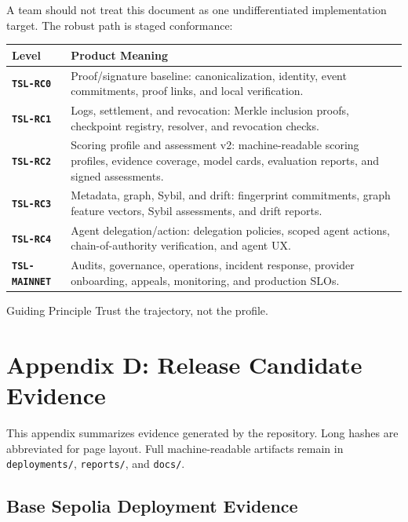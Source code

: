 \documentclass[11pt]{article}
\begin{document}
A team should not treat this document as one undifferentiated implementation target. The robust path is staged conformance:

\begin{center}
\begin{tabularx}{\textwidth}{>{\bfseries}p{} X}
\toprule
Level & Product Meaning \\
\midrule
\texttt{TSL-RC0} & Proof/signature baseline: canonicalization, identity, event commitments, proof links, and local verification. \\
\texttt{TSL-RC1} & Logs, settlement, and revocation: Merkle inclusion proofs, checkpoint registry, resolver, and revocation checks. \\
\texttt{TSL-RC2} & Scoring profile and assessment v2: machine-readable scoring profiles, evidence coverage, model cards, evaluation reports, and signed assessments. \\
\texttt{TSL-RC3} & Metadata, graph, Sybil, and drift: fingerprint commitments, graph feature vectors, Sybil assessments, and drift reports. \\
\texttt{TSL-RC4} & Agent delegation/action: delegation policies, scoped agent actions, chain-of-authority verification, and agent UX. \\
\texttt{TSL-MAINNET} & Audits, governance, operations, incident response, provider onboarding, appeals, monitoring, and production SLOs. \\
\bottomrule
\end{tabularx}
\end{center}

\begin{principlebox}{Guiding Principle}
Trust the trajectory, not the profile.
\end{principlebox}


\section{Appendix D: Release Candidate Evidence}

This appendix summarizes evidence generated by the repository. Long hashes are abbreviated for page layout. Full machine-readable artifacts remain in \texttt{deployments/}, \texttt{reports/}, and \texttt{docs/}.

\subsection{Base Sepolia Deployment Evidence}
\end{document}
